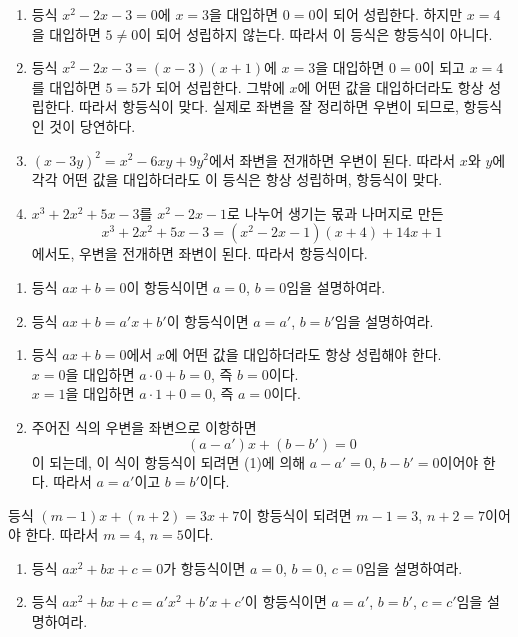 \documentclass{oblivoir}
\begin{document}
%
\exam{}
\begin{enumerate}
\item
등식 \(x^2-2x-3=0\)에 \(x=3\)을 대입하면 \(0=0\)이 되어 성립한다.
하지만 \(x=4\)을 대입하면 \(5\neq0\)이 되어 성립하지 않는다.
따라서 이 등식은 항등식이 아니다.
\item
등식 \(x^2-2x-3=(x-3)(x+1)\)에 \(x=3\)을 대입하면 \(0=0\)이 되고 \(x=4\)를 대입하면 \(5=5\)가 되어 성립한다.
그밖에 \(x\)에 어떤 값을 대입하더라도 항상 성립한다.
따라서 항등식이 맞다.
실제로 좌변을 잘 정리하면 우변이 되므로, 항등식인 것이 당연하다.
\item
\((x-3y)^2=x^2-6xy+9y^2\)에서 좌변을 전개하면 우변이 된다.
따라서 \(x\)와 \(y\)에 각각 어떤 값을 대입하더라도 이 등식은 항상 성립하며, 항등식이 맞다.
\item
\(x^3+2x^2+5x-3\)를 \(x^2-2x-1\)로 나누어 생기는 몫과 나머지로 만든 
\[x^3+2x^2+5x-3=(x^2-2x-1)(x+4)+14x+1\]
에서도, 우변을 전개하면 좌변이 된다.
따라서 항등식이다.
\end{enumerate}

\clearpage
%
\exam{}
\begin{enumerate}
\item
등식 \(ax+b=0\)이 항등식이면 \(a=0\), \(b=0\)임을 설명하여라.
\item
등식 \(ax+b=a'x+b'\)이 항등식이면 \(a=a'\), \(b=b'\)임을 설명하여라.
\end{enumerate}

\begin{mdframed}
\begin{enumerate}
\item
등식 \(ax+b=0\)에서 \(x\)에 어떤 값을 대입하더라도 항상 성립해야 한다.\\
\(x=0\)을 대입하면 \(a\cdot0+b=0\), 즉 \(b=0\)이다.\\
\(x=1\)을 대입하면 \(a\cdot1+0=0\), 즉 \(a=0\)이다.
\item
주어진 식의 우변을 좌변으로 이항하면 \[(a-a')x+(b-b')=0\]이 되는데, 이 식이 항등식이 되려면 (1)에 의해 \(a-a'=0\), \(b-b'=0\)이어야 한다.
따라서 \(a=a'\)이고 \(b=b'\)이다.
\end{enumerate}
\end{mdframed}

%
\exam{}
등식 \((m-1)x+(n+2)=3x+7\)이 항등식이 되려면 \(m-1=3\), \(n+2=7\)이어야 한다.
따라서 \(m=4\), \(n=5\)이다.

\clearpage
%
\prob{}
\begin{enumerate}\label{iden1}
\item
등식 \(ax^2+bx+c=0\)가 항등식이면 \(a=0\), \(b=0\), \(c=0\)임을 설명하여라.
\item
등식 \(ax^2+bx+c=a'x^2+b'x+c'\)이 항등식이면 \(a=a'\), \(b=b'\), \(c=c'\)임을 설명하여라.
\end{enumerate}
\end{document}
